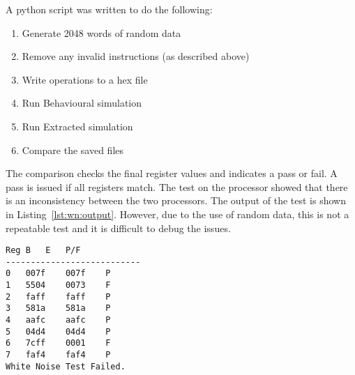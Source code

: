 \noindent A python script was written to do the following:
\begin{enumerate}
\item Generate 2048 words of random data
\item Remove any invalid instructions (as described above)
\item Write operations to a hex file
\item Run Behavioural simulation
\item Run Extracted simulation
\item Compare the saved files
\end{enumerate}

The comparison checks the final register values and indicates a pass or fail. 
A pass is issued if all registers match. 
The test on the processor showed that there is an inconsistency between the two processors. 
The output of the test is shown in Listing~\ref{lst:wn:output}.
However, due to the use of random data, this is not a repeatable test and it is difficult to debug the issues. 



\begin{lstlisting}[label=lst:wn:output,caption={Output of the white noise test}]
Reg	B	E	P/F
---------------------------
0	007f	007f	P
1	5504	0073	F
2	faff	faff	P
3	581a	581a	P
4	aafc	aafc	P
5	04d4	04d4	P
6	7cff	0001	F
7	faf4	faf4	P
White Noise Test Failed.
\end{lstlisting}

